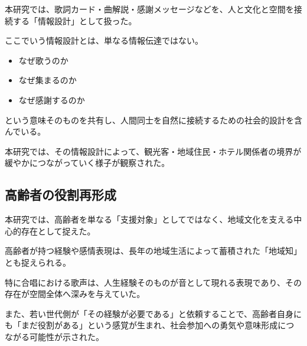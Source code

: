 本研究では、歌詞カード・曲解説・感謝メッセージなどを、人と文化と空間を接続する「情報設計」として扱った。

ここでいう情報設計とは、単なる情報伝達ではない。

\begin{itemize}
\item なぜ歌うのか
\item なぜ集まるのか
\item なぜ感謝するのか
\end{itemize}

という意味そのものを共有し、人間同士を自然に接続するための社会的設計を含んでいる。

本研究では、その情報設計によって、観光客・地域住民・ホテル関係者の境界が緩やかにつながっていく様子が観察された。


\subsection{高齢者の役割再形成}

本研究では、高齢者を単なる「支援対象」としてではなく、地域文化を支える中心的存在として捉えた。

高齢者が持つ経験や感情表現は、長年の地域生活によって蓄積された「地域知」とも捉えられる。

特に合唱における歌声は、人生経験そのものが音として現れる表現であり、その存在が空間全体へ深みを与えていた。

また、若い世代側が「その経験が必要である」と依頼することで、高齢者自身にも「まだ役割がある」という感覚が生まれ、社会参加への勇気や意味形成につながる可能性が示された。
